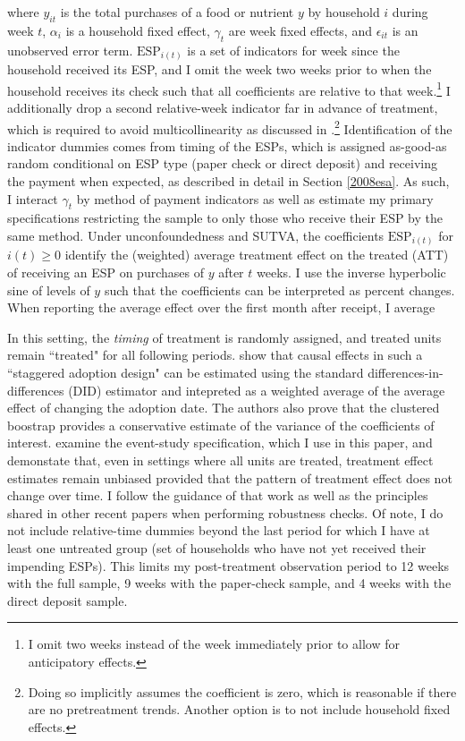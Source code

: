 \documentclass[12pt]{article}
\begin{document}
where $y_{it}$ is the total purchases of a food or nutrient $y$ by household $i$ during week $t$, $\alpha_i$ is a household fixed effect, $\gamma_t$ are week fixed effects, and $\epsilon_{it}$ is an unobserved error term. $\text{ESP}_{i(t)}$ is a set of indicators for week since the household received its ESP, and I omit the week two weeks prior to when the household receives its check such that all coefficients are relative to that week.\footnote{I omit two weeks instead of the week immediately prior to allow for anticipatory effects.} I additionally drop a second relative-week indicator far in advance of treatment, which is required to avoid multicollinearity as discussed in \textcite{borusyak2017revisiting}.\footnote{Doing so implicitly assumes the coefficient is zero, which is reasonable if there are no pretreatment trends. Another option is to not include household fixed effects.} Identification of the indicator dummies comes from timing of the ESPs, which is assigned as-good-as random conditional on ESP type (paper check or direct deposit) and receiving the payment when expected, as described in detail in Section \ref{2008esa}. As such, I interact $\gamma_t$ by method of payment indicators as well as estimate my primary specifications restricting the sample to only those who receive their ESP by the same method. Under unconfoundedness and SUTVA, the coefficients $\text{ESP}_{i(t)}$ for $i(t) \geq 0$ identify the (weighted) average treatment effect on the treated (ATT) of receiving an ESP on purchases of $y$ after $t$ weeks. I use the inverse hyperbolic sine of levels of $y$ such that the coefficients can be interpreted as percent changes. When reporting the average effect over the first month after receipt, I average

In this setting, the \textit{timing} of treatment is randomly assigned, and treated units remain ``treated" for all following periods. \textcite{athey2021design} show that causal effects in such a ``staggered adoption design" can be estimated using the standard differences-in-differences (DID) estimator and intepreted as a weighted average of the average effect of changing the adoption date. The authors also prove that the clustered boostrap provides a conservative estimate of the variance of the coefficients of interest. \textcite{sun2020estimating} examine the event-study specification, which I use in this paper, and demonstate that, even in settings where all units are treated, treatment effect estimates remain unbiased provided that the pattern of treatment effect does not change over time. I follow the guidance of that work as well as the principles shared in other recent papers \parencite{goodman2018difference, callaway2020difference, de2020two} when performing robustness checks. Of note, I do not include relative-time dummies beyond the last period for which I have at least one untreated group (set of households who have not yet received their impending ESPs). This limits my post-treatment observation period to 12 weeks with the full sample, 9 weeks with the paper-check sample, and 4 weeks with the direct deposit sample.
\end{document}
